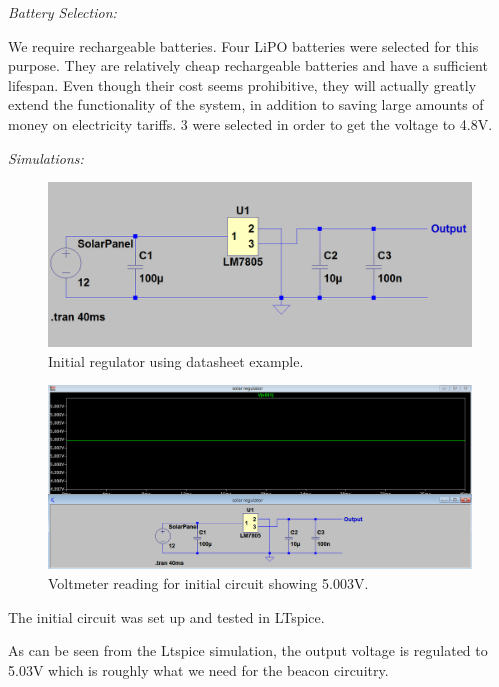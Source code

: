 \textit{Battery Selection:}

We require rechargeable batteries. Four LiPO batteries were selected for this purpose. They are
relatively cheap rechargeable batteries and have a sufficient lifespan. Even though their cost seems
prohibitive, they will actually greatly extend the functionality of the system, in addition to saving
large amounts of money on electricity tariffs. 3 were selected in order to get the voltage to 4.8V.

\textit{Simulations:}

\begin{figure}[H]
\begin{center}
\includegraphics[scale=0.4]{data/power/2.png}
\caption{Initial regulator using datasheet example.}
\label{fig:pow-2}
\end{center}
\end{figure}

\begin{figure}[H]
\begin{center}
\includegraphics[scale=0.3]{data/power/3.png}
\caption{Voltmeter reading for initial circuit showing 5.003V.}
\label{fig:pow-3}
\end{center}
\end{figure}

The initial circuit was set up and tested in LTspice.

As can be seen from the Ltspice simulation, the output voltage is regulated to 5.03V which is roughly
what we need for the beacon circuitry.

